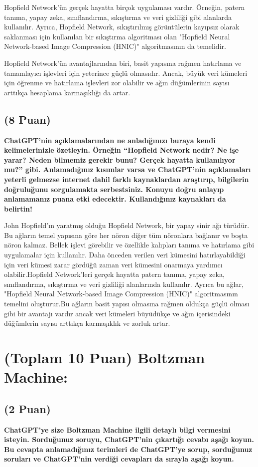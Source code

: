 \documentclass[11pt]{article}
\begin{document}
Hopfield Network'ün gerçek hayatta birçok uygulaması vardır. Örneğin, patern tanıma, yapay zeka, sınıflandırma, sıkıştırma ve veri gizliliği gibi alanlarda kullanılır. Ayrıca, Hopfield Network, sıkıştırılmış görüntülerin kayıpsız olarak saklanması için kullanılan bir sıkıştırma algoritması olan "Hopfield Neural Network-based Image Compression (HNIC)" algoritmasının da temelidir.

Hopfield Network'ün avantajlarından biri, basit yapısına rağmen hatırlama ve tamamlayıcı işlevleri için yeterince güçlü olmasıdır. Ancak, büyük veri kümeleri için öğrenme ve hatırlama işlevleri zor olabilir ve ağın düğümlerinin sayısı arttıkça hesaplama karmaşıklığı da artar.


\subsection{(8 Puan)} \textbf{ChatGPT’nin açıklamalarından ne anladığınızı buraya kendi kelimelerinizle özetleyin. Örneğin ``Hopfield Network nedir? Ne işe yarar? Neden bilmemiz gerekir bunu? Gerçek hayatta kullanılıyor mu?'' gibi. Anlamadığınız kısımlar varsa ve ChatGPT’nin açıklamaları yeterli gelmezse internet dahil farklı kaynaklardan araştırıp, bilgilerin doğruluğunu sorgulamakta serbestsiniz. Konuyu doğru anlayıp anlamamanız puana etki edecektir. Kullandığınız kaynakları da belirtin!}

John Hopfield'ın yaratmış olduğu Hopfield Network, bir yapay sinir ağı türüdür. Bu ağların temel yapısına göre her nöron diğer tüm nöronlara bağlanır ve boşta nöron kalmaz. Bellek işlevi görebilir ve özellikle kalıpları tanıma ve hatırlama gibi uygulamalar için kullanılır. Daha önceden verilen veri kümesini hatırlayabildiği için veri kümesi zarar gördüğü zaman veri kümesini onarmaya yardımcı olabilir.Hopfield Network'leri gerçek hayatta patern tanıma, yapay zeka, sınıflandırma, sıkıştırma ve veri gizliliği alanlarında kullanılır. Ayrıca bu ağlar, "Hopfield Neural Network-based Image Compression (HNIC)" algoritmasının temelini oluşturur.Bu ağların basit yapısı olmasına rağmen oldukça güçlü olması gibi bir avantajı vardır ancak veri kümeleri büyüdükçe ve ağın içerisindeki düğümlerin sayısı arttıkça karmaşıklık ve zorluk artar.

\section{(Toplam 10 Puan) Boltzman Machine:}

\subsection{(2 Puan)} \textbf{ChatGPT’ye size Boltzman Machine ilgili detaylı bilgi vermesini isteyin. Sorduğunuz soruyu, ChatGPT'nin çıkartığı cevabı aşağı koyun. Bu cevapta anlamadığınız terimleri de ChatGPT’ye sorup, sorduğunuz soruları ve ChatGPT’nin verdiği cevapları da sırayla aşağı koyun.}
\end{document}

